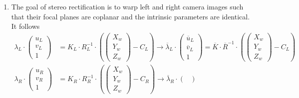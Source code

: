 \documentclass[a4paper,12 pt]{article}
\theoremstyle{definition}
\theoremstyle{remark}
\theoremstyle{definition}
\theoremstyle{definition}
\theoremstyle{definition}
\theoremstyle{remark}
\theoremstyle{definition}
\begin{document}
\begin{enumerate}
\begin{equation}
\begin{split}
\begin{pmatrix}
 Z_w
 \end{pmatrix}-C_L\right) \quad \text{left camera}\\
 \lambda_R\cdot \begin{pmatrix}
 u_R\\
 v_R\\
 1
 \end{pmatrix}&= K_R\cdot R_R^{-1}\cdot \left(\begin{pmatrix}
 X_w\\
 Y_w\\
 Z_w
 \end{pmatrix}-C_R\right) \quad \text{right camera}
\end{split}
\end{equation}
\item The goal of stereo rectification is to warp left and right camera images such that their focal planes are coplanar and the intrinsic parameters are identical. It follows 
\begin{equation}
\begin{split}
\lambda_L\cdot \begin{pmatrix}
 u_L\\
 v_L\\
 1
 \end{pmatrix}&= K_L\cdot R_L^{-1}\cdot \left(\begin{pmatrix}
 X_w\\
 Y_w\\
 Z_w
 \end{pmatrix}-C_L\right) \rightarrow \overline{\lambda}_L\cdot \begin{pmatrix}
 \overline{u}_L\\
 \overline{v}_L\\
 1
 \end{pmatrix}= \overline{K}\cdot \overline{R}^{-1}\cdot \left(\begin{pmatrix}
 X_w\\
 Y_w\\
 Z_w
 \end{pmatrix}-C_L\right) \\
 \lambda_R\cdot \begin{pmatrix}
 u_R\\
 v_R\\
 1
 \end{pmatrix}&= K_R\cdot R_R^{-1}\cdot \left(\begin{pmatrix}
 X_w\\
 Y_w\\
 Z_w
 \end{pmatrix}-C_R\right) \rightarrow \overline{\lambda}_R\cdot \begin{pmatrix}

\end{pmatrix}
\end{split}
\end{equation}
\end{enumerate}
\end{document}

